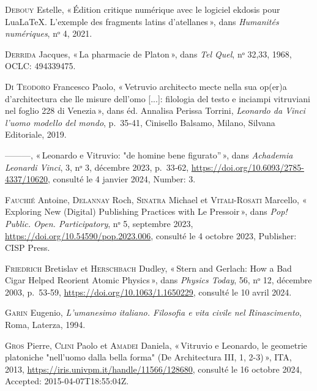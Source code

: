 \begin{CSLReferences}{1}{0}
\leavevmode{}%
\textsc{Debouy} Estelle, {«\,Édition critique numérique avec le logiciel
ekdosis pour {LuaLaTeX}. {L}'exemple des fragments latins
d'atellanes\,»}, dans \emph{Humanités numériques}, nᵒ 4, 2021.

\leavevmode{}%
\textsc{Derrida} Jacques, {«\,La pharmacie de {Platon}\,»}, dans
\emph{Tel Quel}, nᵒ 32,33, 1968, OCLC: 494339475.

\leavevmode{}%
\textsc{Di Teodoro} Francesco Paolo, {«\,Vetruvio architecto mecte nella
sua op(er)a d'architectura che lle misure dell'omo {[}...{]}: filologia
del testo e inciampi vitruviani nel foglio 228 di {Venezia}\,»}, dans
éd. Annalisa Perissa Torrini, \emph{Leonardo da {Vinci} l'uomo modello
del mondo}, p.~35‑41, Cinisello Balsamo, Milano, Silvana Editoriale,
2019.

\leavevmode{}%
---------, {«\,Leonardo e {Vitruvio}: "de homine bene figurato''\,»},
dans \emph{Achademia Leonardi Vinci}, 3, nᵒ 3, décembre 2023, p.~33‑62,
\url{https://doi.org/10.6093/2785-4337/10620}, consulté le 4 janvier
2024, Number: 3.

\leavevmode{}%
\textsc{Fauchié} Antoine, \textsc{Delannay} Roch, \textsc{Sinatra}
Michael et \textsc{Vitali-Rosati} Marcello, {«\,Exploring {New}
({Digital}) {Publishing} {Practices} with {Le} {Pressoir}\,»}, dans
\emph{Pop! Public. Open. Participatory}, nᵒ 5, septembre 2023,
\url{https://doi.org/10.54590/pop.2023.006}, consulté le 4 octobre 2023,
Publisher: CISP Press.

\leavevmode{}%
\textsc{Friedrich} Bretislav et \textsc{Herschbach} Dudley, {«\,Stern
and {Gerlach}: {How} a {Bad} {Cigar} {Helped} {Reorient} {Atomic}
{Physics}\,»}, dans \emph{Physics Today}, 56, nᵒ 12, décembre 2003,
p.~53‑59, \url{https://doi.org/10.1063/1.1650229}, consulté le 10 avril
2024.

\leavevmode{}%
\textsc{Garin} Eugenio, \emph{L'umanesimo italiano. {Filosofia} e vita
civile nel {Rinascimento}}, Roma, Laterza, 1994.

\leavevmode{}%
\textsc{Gros} Pierre, \textsc{Clini} Paolo et \textsc{Amadei} Daniela,
{«\,Vitruvio e {Leonardo}, le geometrie platoniche "nell'uomo dalla
bella forma" ({De} {Architectura} {III}, 1, 2-3)\,»}, ITA, 2013,
\url{https://iris.univpm.it/handle/11566/128680}, consulté le 16 octobre
2024, Accepted: 2015-04-07T18:55:04Z.


\end{CSLReferences}
